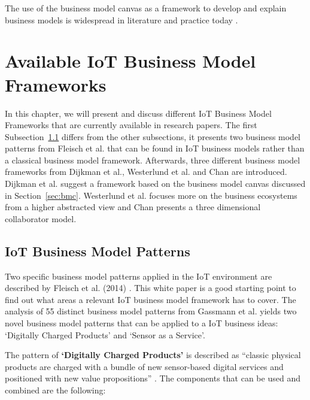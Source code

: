 		The use of the business model canvas as a framework to develop and explain business models is widespread in literature and practice today .

\section{Available IoT Business Model Frameworks}
\label{sec:bmf_available}
	In this chapter, we will present and discuss different IoT Business Model Frameworks that are currently available in research papers. The first Subsection~\ref{subsec:fleisch} differs from the other subsections, it presents two business model patterns from Fleisch et al. that can be found in IoT business models rather than a classical business model framework. Afterwards, three different business model frameworks from Dijkman et al., Westerlund et al. and Chan are introduced. Dijkman et al. suggest a framework based on the business model canvas discussed in Section~\ref{sec:bmc}. Westerlund et al. focuses more on the business ecosystems from a higher abstracted view and Chan presents a three dimensional collaborator model.

	\subsection{IoT Business Model Patterns}
	\label{subsec:fleisch}
		Two specific business model patterns applied in the IoT environment are described by Fleisch et al. (2014) \cite{fleisch}. This white paper is a good starting point to find out what areas a relevant IoT business model framework has to cover. The analysis of 55 distinct business model patterns from Gassmann et al. \cite{gassmann55} yields two novel business model patterns that can be applied to a IoT business ideas: `Digitally Charged Products' and `Sensor as a Service'.

		The pattern of \textbf{`Digitally Charged Products'} is described as ``classic physical products are charged with a bundle of new sensor-based digital services and positioned with new value propositions'' \cite[p. 10]{fleisch}. The components that can be used and combined are the following:

